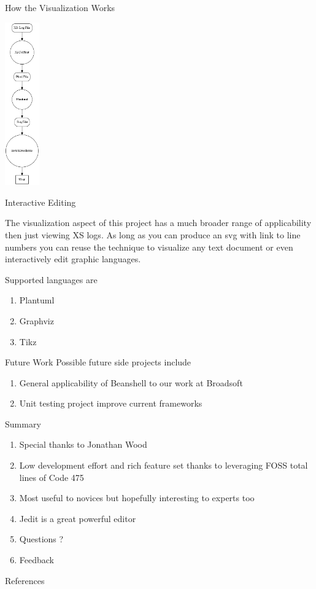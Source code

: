 \documentclass{beamer}
\begin{document}
\begin{frame}[fragile]{How the Visualization Works}
\begin{center}
\includegraphics[height=7cm]{dattflow.png}
\end{center}
\end{frame}

\begin{frame}{Interactive Editing}

The visualization aspect of this project has a much broader range of applicability then just viewing XS logs. As long as you can produce an
svg with link to line numbers you can reuse the technique to visualize any
text document or even interactively edit graphic languages.

Supported languages are

\begin{enumerate}
\item Plantuml\cite{Plantuml}
\item Graphviz\cite{Graphviz}
\item Tikz\cite{Tikz} 
\end{enumerate}

\end{frame}



\begin{frame}{Future Work}
Possible future side projects include
\begin{enumerate}
\item General applicability of Beanshell to our work at Broadsoft
\item Unit testing project improve current frameworks
\end{enumerate}
\end{frame}


\begin{frame}{Summary}
\begin{enumerate}
\item Special thanks to Jonathan Wood
\item Low development effort and rich feature set thanks to leveraging FOSS total lines of Code 475
\item Most useful to novices but hopefully interesting to experts too
\item Jedit is a great powerful editor
\item Questions ?
\item Feedback
\end{enumerate}
\end{frame}

\begin{frame}[allowframebreaks]{References}


\end{frame}
\end{document}
